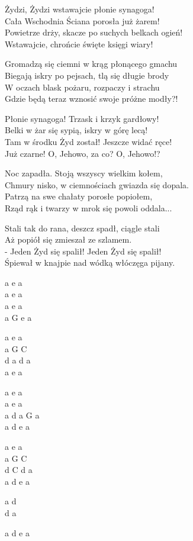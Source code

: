 \begin{text}
    Żydzi, Żydzi wstawajcie płonie synagoga!\\
    Cała Wschodnia Ściana porosła już żarem!\\
    Powietrze drży, skacze po suchych belkach ogień!\\
    Wstawajcie, chrońcie święte księgi wiary!

    Gromadzą się ciemni w krąg płonącego gmachu\\
    Biegają iskry po pejsach, tlą się długie brody\\
    W oczach blask pożaru, rozpaczy i strachu\\
    Gdzie będą teraz wznosić swoje próżne modły?!

    Płonie synagoga! Trzask i krzyk gardłowy!\\
    Belki w żar się sypią, iskry w górę lecą!\\
    Tam w środku Żyd został! Jeszcze widać ręce!\\
    Już czarne! O, Jehowo, za co? O, Jehowo!?

    Noc zapadła. Stoją wszyscy wielkim kołem,\\
    Chmury nisko, w ciemnościach gwiazda się dopala.\\
    Patrzą na swe chałaty porosłe popiołem,\\
    Rząd rąk i twarzy w mrok się powoli oddala...

    Stali tak do rana, deszcz spadł, ciągle stali\\
    Aż popiół się zmieszał ze szlamem.\\
    - Jeden Żyd się spalił! Jeden Żyd się spalił!\\
    Śpiewał w knajpie nad wódką włóczęga pijany.
\end{text}
\begin{chord}
    a e a\\
    a e a\\
    a e a\\
    a G e a

    a e a\\
    a G C\\
    d a d a\\
    a e a

    a e a\\
    a e a\\
    a d a G a\\
    a d e a

    a e a\\
    a G C\\
    d C d a\\
    a d e a

    a d\\
    d a

    a d e a
\end{chord}